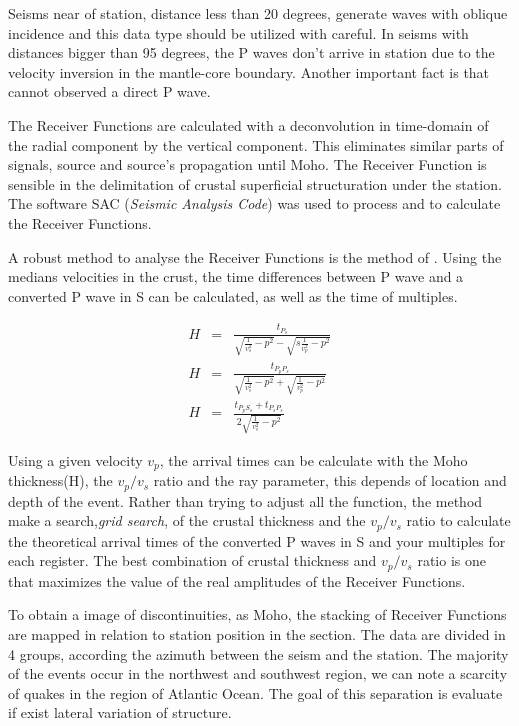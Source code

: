 \documentclass[twoside,letterpaper,twocolumn]{article}
\begin{document}
Seisms near of station, distance less than 20 degrees, generate waves with oblique incidence and this data type should be utilized with careful. In seisms with distances bigger than 95 degrees, the P waves don't arrive in station due to  the velocity inversion in the mantle-core boundary. Another important fact is that cannot observed a direct P wave.

The Receiver Functions are calculated with a deconvolution in time-domain of the radial component by the vertical component. This eliminates similar parts of signals, source and source's propagation until Moho. The Receiver Function is sensible in the delimitation of crustal superficial structuration under the station. The software SAC (\textit{Seismic Analysis Code}) was used to process and to calculate the Receiver Functions. 

A robust method to analyse the Receiver Functions is the method of \cite{zhu_moho_2000}. Using the medians velocities in the crust, the time differences between P wave and a converted P wave in S can be calculated, as well as the time of multiples.

\begin{eqnarray}
H &=& \frac{t_{P_{s}}}{\sqrt{\frac{1}{v_{s}^{2}}-p^{2}}-\sqrt{s\frac{1}{v_{p}^{2}}-p^{2}}}
\\
H &=& \frac{t_{P_{p}P_{s}}}{\sqrt{\frac{1}{v_{s}^{2}}-p^{2}}+\sqrt{\frac{1}{v_{p}^{2}}-p^{2}}}
\\
H &=& \frac{t_{P_{p}S_{s}}+t_{P_{s}P_{s}}}{2\sqrt{\frac{1}{v_{s}^{2}}-p^{2}}}
\end{eqnarray}

Using a given velocity  $v_{p}$, the arrival times can be calculate with the Moho thickness(H), the $v_{p}/v_{s}$ ratio and the ray parameter, this depends of location and depth of the event. Rather than trying to adjust all the function, the method make a search,\textit{grid search}, of the crustal thickness and the $v_{p}/v_{s}$ ratio to calculate the theoretical arrival times of the converted P waves in S and your multiples for each register. The best combination of crustal thickness and $v_{p}/v_{s}$ ratio is one that maximizes the value of the real amplitudes of the Receiver Functions.

To obtain a image of discontinuities, as Moho, the stacking of Receiver Functions are mapped in relation to station position in the section. The data are divided in 4 groups, according the azimuth between the seism and the station. The majority of the events occur in the northwest and southwest region, we can note a scarcity of quakes in the region of Atlantic Ocean. The goal of this separation is evaluate if exist lateral variation of structure.
\end{document}
